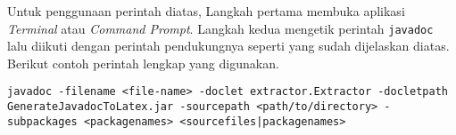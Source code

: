 Untuk penggunaan perintah diatas, Langkah pertama membuka aplikasi {\it Terminal} atau {\it Command Prompt}. Langkah kedua mengetik perintah {\tt javadoc} lalu diikuti dengan perintah pendukungnya seperti yang sudah dijelaskan diatas. Berikut contoh perintah lengkap yang digunakan.

\begin{lstlisting}[numbers=none, caption=Perintah Javadoc, label=potongan-syntax]
javadoc -filename <file-name> -doclet extractor.Extractor -docletpath GenerateJavadocToLatex.jar -sourcepath <path/to/directory> -subpackages <packagenames> <sourcefiles|packagenames>
\end{lstlisting}

%
%
%
